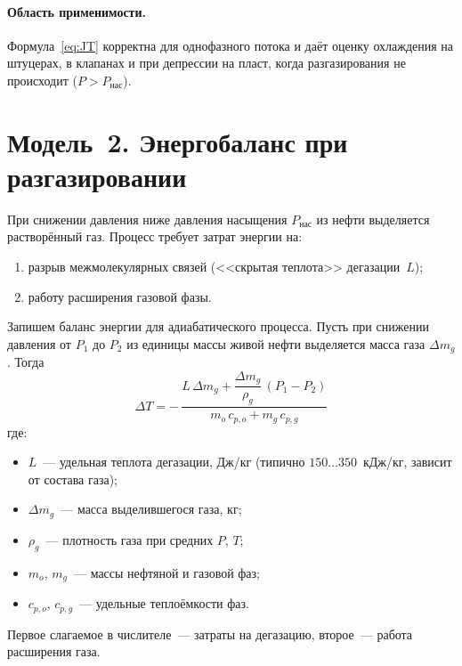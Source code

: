 \documentclass[12pt,a4paper]{article}
\begin{document}
\paragraph{Область применимости.}
Формула~\eqref{eq:JT} корректна для однофазного потока и даёт оценку
охлаждения на штуцерах, в клапанах и при депрессии на пласт, когда
разгазирования не происходит ($P > P_{\text{нас}}$).

\section{Модель~2. Энергобаланс при разгазировании}

При снижении давления ниже давления насыщения $P_{\text{нас}}$ из нефти
выделяется растворённый газ. Процесс требует затрат энергии на:
\begin{enumerate}[nosep]
  \item разрыв межмолекулярных связей (<<скрытая теплота>> дегазации~$L$);
  \item работу расширения газовой фазы.
\end{enumerate}

Запишем баланс энергии для адиабатического процесса. Пусть при снижении
давления от $P_1$ до $P_2$ из единицы массы живой нефти выделяется масса газа
$\Delta m_g$. Тогда
\begin{equation}\label{eq:flash}
  \boxed{\;
    \Delta T = -\,\frac{L\,\Delta m_g
      + \dfrac{\Delta m_g}{\rho_g}\,(P_1 - P_2)}
    {m_o\,c_{p,o} + m_g\,c_{p,g}}
  \;}
\end{equation}
где:
\begin{itemize}[nosep]
  \item $L$~--- удельная теплота дегазации, Дж/кг
        (типично $150\ldots350$~кДж/кг, зависит от состава газа);
  \item $\Delta m_g$~--- масса выделившегося газа, кг;
  \item $\rho_g$~--- плотность газа при средних $P$, $T$;
  \item $m_o$, $m_g$~--- массы нефтяной и газовой фаз;
  \item $c_{p,o}$, $c_{p,g}$~--- удельные теплоёмкости фаз.
\end{itemize}

Первое слагаемое в числителе~--- затраты на дегазацию, второе~--- работа
расширения газа.
\end{document}
